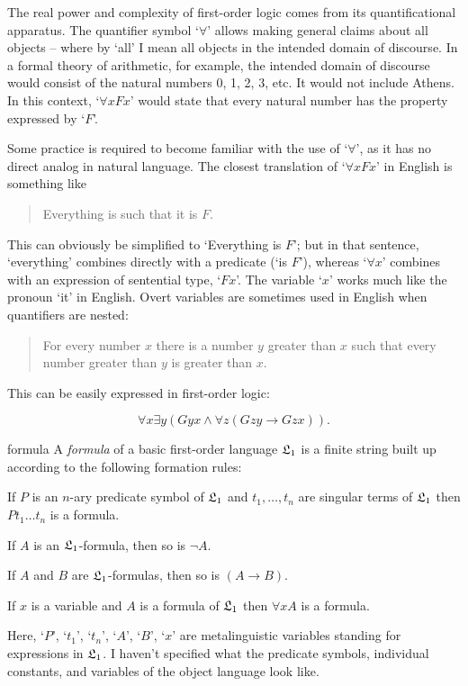 The real power and complexity of first-order logic comes from
its quantificational apparatus.
The quantifier symbol `$\forall$' allows making general claims about all objects
-- where by `all' I mean
all objects in the intended domain of discourse.
In a formal theory of arithmetic,
for example,
the intended domain of discourse would consist of the natural numbers 0, 1, 2, 3, etc.
It would not include Athens.
In this context,
`$\forall x Fx$' would state that
every natural number has the property expressed by `$F$'.

Some practice is required to become familiar with the use of `$\forall$',
as it has no direct analog in natural language.
The closest translation of `$\forall x Fx$' in English is something like

\begin{quote}
  Everything is such that it is $F$.
\end{quote}

This can obviously be simplified to `Everything is $F$';
but in that sentence,
`everything' combines directly with a predicate (`is $F$'),
whereas `$\forall x$' combines with an expression of sentential type, `$Fx$'.
The variable `$x$' works much like the pronoun `it' in English.
Overt variables are sometimes used in English when quantifiers are nested:

\begin{quote}
  For every number $x$ there is a number $y$ greater than $x$ such that every
  number greater than $y$ is greater than $x$.
\end{quote}

This can be easily expressed in first-order logic:

\[
  \forall x \exists y (Gyx \land \forall z (Gzy \to Gzx)).
\]

\begin{definition}{}{formula}
  A \emph{formula} of a basic first-order language $\mathfrak{L}_1$
  is a finite string built up according to the following formation rules:
  \begin{enumerate*}
    \item[(i)] If $P$ is an $n$-ary predicate symbol of $\mathfrak{L}_1$ and $t_{1},\ldots,t_{n}$ are singular terms of $\mathfrak{L}_1$ then $Pt_{1}\ldots t_{n}$ is a formula.
    \item[(ii)] If $A$ is an $\mathfrak{L}_1$-formula, then so is $\neg A$.
    \item[(iii)] If $A$ and $B$ are $\mathfrak{L}_1$-formulas, then so is $(A \to B)$.
    \item[(iv)] If $x$ is a variable and $A$ is a formula of $\mathfrak{L}_1$ then $\forall x A$ is a formula.
  \end{enumerate*}
\end{definition}
\noindent%
Here, `$P$', `$t_{1}$', `$t_{n}$', `$A$', `$B$', `$x$' are metalinguistic variables
standing for expressions in $\mathfrak{L}_1$.
I haven't specified what the predicate symbols, individual constants, and variables of
the object language look like.


